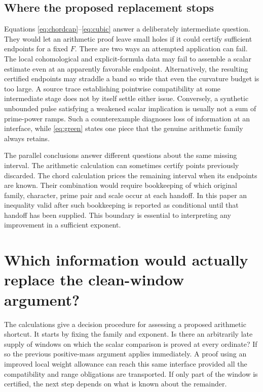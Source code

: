 \documentclass[12pt,letterpaper]{article}
\begin{document}
\subsection{Where the proposed replacement stops}
Equations \eqref{eq:chordcap}--\eqref{eq:cubic} answer a deliberately intermediate question. They would let an arithmetic proof leave small holes if it could certify sufficient endpoints for a fixed \(F\). There are two ways an attempted application can fail. The local cohomological and explicit-formula data may fail to assemble a scalar estimate even at an apparently favorable endpoint. Alternatively, the resulting certified endpoints may straddle a band so wide that even the curvature budget is too large. A source trace establishing pointwise compatibility at some intermediate stage does not by itself settle either issue. Conversely, a synthetic unbounded pulse satisfying a weakened scalar implication is usually not a sum of prime-power ramps. Such a counterexample diagnoses loss of information at an interface, while \eqref{eq:green} states one piece that the genuine arithmetic family always retains.

The parallel conclusions answer different questions about the same missing interval. The arithmetic calculation can sometimes certify points previously discarded. The chord calculation prices the remaining interval when its endpoints are known. Their combination would require bookkeeping of which original family, character, prime pair and scale occur at each handoff. In this paper an inequality valid after such bookkeeping is reported as conditional until that handoff has been supplied. This boundary is essential to interpreting any improvement in a sufficient exponent.


\section{Which information would actually replace the clean-window argument?}
The calculations give a decision procedure for assessing a proposed arithmetic shortcut. It starts by fixing the family and exponent. Is there an arbitrarily late supply of windows on which the scalar comparison is proved at every ordinate? If so the previous positive-mass argument applies immediately. A proof using an improved local weight allowance can reach this same interface provided all the compatibility and range obligations are transported. If only part of the window is certified, the next step depends on what is known about the remainder.
\end{document}
